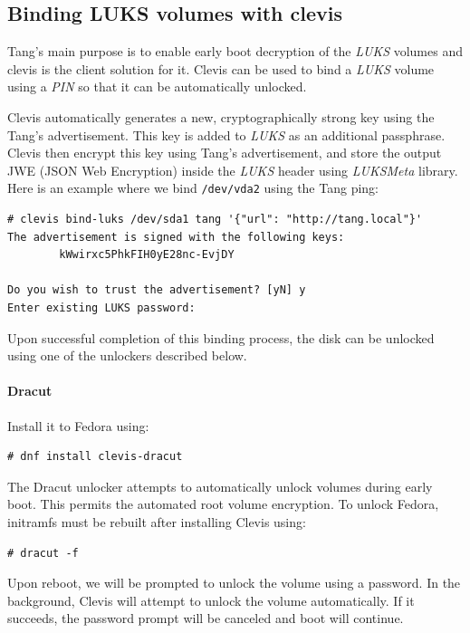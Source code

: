 \subsection{Binding LUKS volumes with clevis}\label{dracut}
Tang's main purpose is to enable early boot decryption of the {\it LUKS} volumes and clevis is the client solution for it.
Clevis can be used to bind a {\it LUKS} volume using a {\it PIN} so that it can be automatically unlocked.

Clevis automatically generates a new, cryptographically strong key using the Tang's advertisement.
This key is added to {\it LUKS} as an additional passphrase.
Clevis then encrypt this key using Tang's advertisement, and store the output JWE (JSON Web Encryption) inside the {\it LUKS} header using {\it LUKSMeta} library.
Here is an example where we bind {\tt /dev/vda2} using the Tang ping:
\begin{lstlisting}[columns=fixed,basicstyle=\ttfamily\footnotesize,tabsize=4,backgroundcolor=\color{yellow!10}]
# clevis bind-luks /dev/sda1 tang '{"url": "http://tang.local"}'
The advertisement is signed with the following keys:
        kWwirxc5PhkFIH0yE28nc-EvjDY

Do you wish to trust the advertisement? [yN] y
Enter existing LUKS password:
\end{lstlisting}

Upon successful completion of this binding process, the disk can be unlocked using one of the unlockers described below.



\paragraph{Dracut}\label{dracut}Install it to Fedora using:
\begin{lstlisting}[columns=fixed,basicstyle=\ttfamily\footnotesize,tabsize=4,backgroundcolor=\color{yellow!10}]
# dnf install clevis-dracut
\end{lstlisting}

The Dracut unlocker attempts to automatically unlock volumes during early boot.
This permits the automated root volume encryption.
To unlock Fedora, initramfs must be rebuilt after installing Clevis using:

\begin{lstlisting}[columns=fixed,basicstyle=\ttfamily\footnotesize,tabsize=4,backgroundcolor=\color{yellow!10}]
# dracut -f
\end{lstlisting}
Upon reboot, we will be prompted to unlock the volume using a password.
In the background, Clevis will attempt to unlock the volume automatically.
If it succeeds, the password prompt will be canceled and boot will continue.



